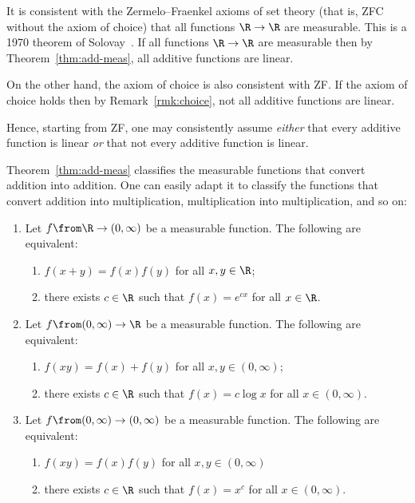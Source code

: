\begin{remark}
It is consistent with the Zermelo--Fraenkel%
%
%
% 
axioms of set theory (that is, ZFC without the axiom of choice) that all
functions $\R \to \R$ are measurable.  This is a 1970 theorem of
Solovay~\cite{SoloMST}.%
%
% 
If all functions $\R \to \R$ are measurable then
by Theorem~\ref{thm:add-meas}, all additive functions are linear.

On the other hand, the axiom of choice is also consistent with ZF.  If the
axiom of choice%
%
% 
holds then by Remark~\ref{rmk:choice}, not all additive functions are
linear.

Hence, starting from ZF, one may consistently assume \emph{either} that
every additive function is linear \emph{or} that not every additive
function is linear.
\end{remark}

Theorem~\ref{thm:add-meas} classifies the measurable functions that convert
addition into addition.  One can easily adapt it to classify the
functions that convert addition into multiplication, multiplication into
multiplication, and so on:

\begin{cor}
\begin{enumerate}
\item 
{}
Let $f \from \R \to (0, \infty)$ be a measurable function.  The following
are equivalent:
% 
\begin{enumerate}
\item 
$f(x + y) = f(x)f(y)$ for all $x, y \in \R$;

\item
there exists $c \in \R$ such that $f(x) = e^{cx}$ for all $x \in \R$.
\end{enumerate}

\item
{}
Let $f \from (0, \infty) \to \R$ be a measurable function.  The following
are equivalent:
% 
\begin{enumerate}
\item 
$f(xy) = f(x) + f(y)$ for all $x, y \in (0, \infty)$;

\item
there exists $c \in \R$ such that $f(x) = c \log x$ for all $x \in (0,
\infty)$. 
\end{enumerate}

\item
{}
Let $f \from (0, \infty) \to (0, \infty)$ be a measurable function.  The
following are equivalent:
% 
\begin{enumerate}
\item 
$f(xy) = f(x)f(y)$ for all $x, y \in (0, \infty)$

\item
there exists $c \in \R$ such that $f(x) = x^c$ for all $x \in (0, \infty)$.
\end{enumerate}
\end{enumerate}
\end{cor}

